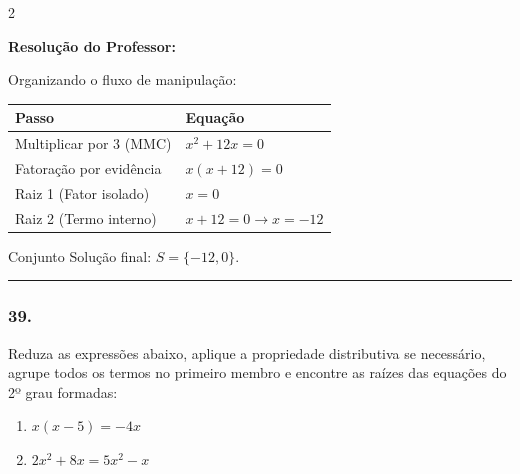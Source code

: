 \begin{multicols*}{2}
\ifgabarito
    \begin{tcolorbox}[colback=CorTitUm!5, colframe=CorTitUm, boxrule=1pt, arc=4pt, left=6pt, right=6pt, top=6pt, bottom=6pt]
    \small\textbf{\textcolor{CorTitUm}{Resolução do Professor:}}\par\vspace{0.1cm}
    \color{CinzaEscuro}
    Organizando o fluxo de manipulação:
    \vspace{0.1cm}
    \begin{center}
    \begin{tabular}{|l|l|}
    \hline
    \textbf{Passo} & \textbf{Equação} \\
    \hline
    Multiplicar por 3 (MMC) & $x^2 + 12x = 0$ \\
    \hline
    Fatoração por evidência & $x(x + 12) = 0$ \\
    \hline
    Raiz 1 (Fator isolado) & $x = 0$ \\
    \hline
    Raiz 2 (Termo interno) & $x + 12 = 0 \rightarrow x = -12$ \\
    \hline
    \end{tabular}
    \end{center}
    \vspace{0.1cm}
    Conjunto Solução final: $S = \{-12, 0\}$.
    \end{tcolorbox}
\fi

\par\vspace{\espacoQuestao}

\noindent\textcolor{CorLinha}{\rule{\linewidth}{0.5pt}} 
\par\vspace{\espacoPreQuestao}
\subsubsection*{39.} Reduza as expressões abaixo, aplique a propriedade distributiva se necessário, agrupe todos os termos no primeiro membro e encontre as raízes das equações do 2º grau formadas:
\begin{enumerate}[label=\Alph*), itemsep=\espacoAlt]
    \item $ x(x - 5) = -4x $
    \item $ 2x^2 + 8x = 5x^2 - x $
\end{enumerate}


\end{multicols*}

